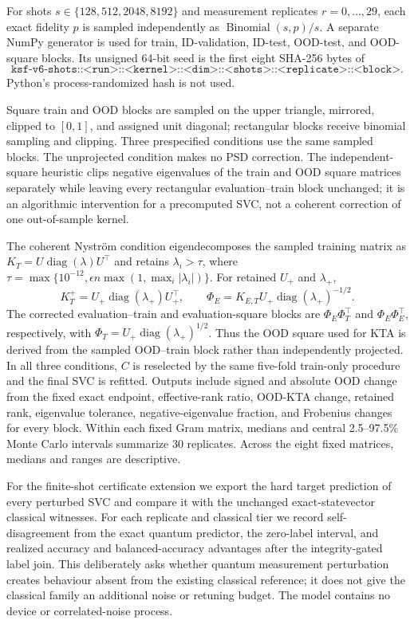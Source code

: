 \documentclass[referee,lineno,pdflatex,sn-vancouver-num]{sn-jnl}
\theoremstyle{thmstyleone}%
\theoremstyle{thmstyletwo}%
\theoremstyle{thmstylethree}%
\begin{document}
For shots $s\in\{128,512,2048,8192\}$ and measurement replicates $r=0,\ldots,29$, each exact fidelity $p$ is sampled independently as $\operatorname{Binomial}(s,p)/s$. A separate NumPy generator is used for train, ID-validation, ID-test, OOD-test, and OOD-square blocks. Its unsigned 64-bit seed is the first eight SHA-256 bytes of
\[
\texttt{ksf-v6-shots::<run>::<kernel>::<dim>::<shots>::<replicate>::<block>}.
\]
Python's process-randomized hash is not used.

Square train and OOD blocks are sampled on the upper triangle, mirrored, clipped to $[0,1]$, and assigned unit diagonal; rectangular blocks receive binomial sampling and clipping. Three prespecified conditions use the same sampled blocks. The unprojected condition makes no PSD correction. The independent-square heuristic clips negative eigenvalues of the train and OOD square matrices separately while leaving every rectangular evaluation--train block unchanged; it is an algorithmic intervention for a precomputed SVC, not a coherent correction of one out-of-sample kernel.

The coherent Nystr{\"o}m condition eigendecomposes the sampled training matrix as $K_T=U\operatorname{diag}(\lambda)U^\top$ and retains $\lambda_i>\tau$, where $\tau=\max\{10^{-12},\epsilon n\max(1,\max_i|\lambda_i|)\}$. For retained $U_+$ and $\lambda_+$,
\[
K_T^+=U_+\operatorname{diag}(\lambda_+)U_+^\top,\qquad
\Phi_E=K_{E,T}U_+\operatorname{diag}(\lambda_+)^{-1/2}.
\]
The corrected evaluation--train and evaluation-square blocks are $\Phi_E\Phi_T^\top$ and $\Phi_E\Phi_E^\top$, respectively, with $\Phi_T=U_+\operatorname{diag}(\lambda_+)^{1/2}$. Thus the OOD square used for KTA is derived from the sampled OOD--train block rather than independently projected. In all three conditions, $C$ is reselected by the same five-fold train-only procedure and the final SVC is refitted. Outputs include signed and absolute OOD change from the fixed exact endpoint, effective-rank ratio, OOD-KTA change, retained rank, eigenvalue tolerance, negative-eigenvalue fraction, and Frobenius changes for every block. Within each fixed Gram matrix, medians and central 2.5--97.5\% Monte Carlo intervals summarize 30 replicates. Across the eight fixed matrices, medians and ranges are descriptive.

For the finite-shot certificate extension we export the hard target prediction of every perturbed SVC and compare it with the unchanged exact-statevector classical witnesses. For each replicate and classical tier we record self-disagreement from the exact quantum predictor, the zero-label interval, and realized accuracy and balanced-accuracy advantages after the integrity-gated label join. This deliberately asks whether quantum measurement perturbation creates behaviour absent from the existing classical reference; it does not give the classical family an additional noise or retuning budget. The model contains no device or correlated-noise process.
\end{document}

